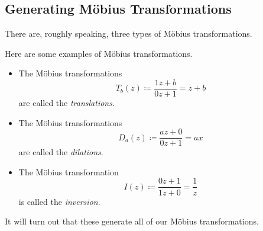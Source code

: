 \documentclass[../notes.tex]{subfiles}
\begin{document}
\subsection{Generating M\"obius Transformations}
There are, roughly speaking, three types of M\"obius transformations.
\begin{definition}
	Here are some examples of M\"obius transformations.
	\begin{itemize}
		\item The M\"obius transformations
		\[T_b(z)\coloneqq\frac{1z+b}{0z+1}=z+b\]
		are called the \textit{translations}.
		\item The M\"obius transformations
		\[D_a(z)\coloneqq\frac{az+0}{0z+1}=ax\]
		are called the \textit{dilations}.
		\item The M\"obius transformation
		\[I(z)\coloneqq\frac{0z+1}{1z+0}=\frac1z\]
		is called the \textit{inversion}.
	\end{itemize}
\end{definition}
It will turn out that these generate all of our M\"obius transformations.
\end{document}

